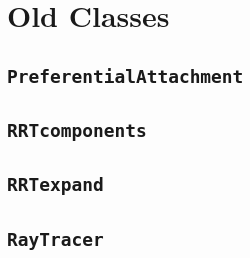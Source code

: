 \section{Old Classes}

\subsection{\texttt{PreferentialAttachment}}

\subsection{\texttt{RRTcomponents}}

\subsection{\texttt{RRTexpand}}

\subsection{\texttt{RayTracer}}

